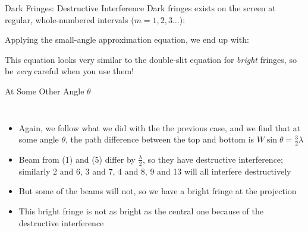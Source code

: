 \documentclass[compress,aspectratio=169]{beamer}
\newcommand{\eq}[2]{\vspace{#1}{\LARGE\begin{displaymath}#2\end{displaymath}}}
\begin{document}
\begin{frame}{Dark Fringes: Destructive Interference}
  Dark fringes exists on the screen at regular, whole-numbered intervals
  ($m=1,2,3\ldots$):

  \eq{-.2in}{
    \boxed{m\lambda=W\sin\theta_m}
  }
  
  \vspace{-.1in}Applying the small-angle approximation equation, we end up with:

  \eq{-.2in}{
    \boxed{y_m=\frac{m\lambda L}{W}}
  }
  
  This equation looks very similar to the double-slit equation for
  \emph{bright} fringes, so be \emph{very} careful when you use them!
\end{frame}



\begin{frame}{At Some Other Angle $\theta$}
  \begin{columns}

    \begin{itemize}
    \item Again, we follow what we did with the the previous case, and we
      find that at some angle $\theta$, the path difference between the top
      and bottom is $W\sin\theta=\frac{3}{2}\lambda$
    \item Beam from (1) and (5) differ by $\frac{\lambda}{2}$, so they
      have destructive interference; similarly 2 and 6, 3 and 7, 4 and 8,
      9 and 13 will all interfere destructively
    \item But some of the beams will not, so we have a bright fringe at the 
      projection
    \item This bright fringe is not as bright as the central one because
      of the destructive interference
    \end{itemize}
  \end{columns}
\end{frame}
\end{document}

